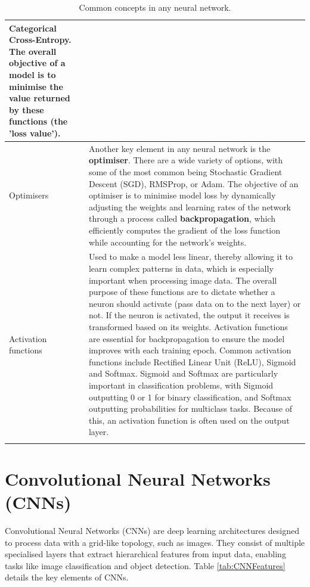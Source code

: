 \documentclass[12pt]{report}
\begin{document}
\begin{longtable}{ | p{} | p{} | }
    Categorical Cross-Entropy. The overall objective of a model is to minimise the value returned by these functions (the 'loss value').  \\
    \hline 
    Optimisers & Another key element in any neural network is the \textbf{optimiser}. There are a wide variety of options,
    with some of the most common being Stochastic Gradient Descent (SGD), RMSProp, or Adam. The objective of an optimiser 
    is to minimise model loss by dynamically adjusting the weights and learning rates of the network through a process called 
    \textbf{backpropagation}, which efficiently computes the gradient of the loss function while accounting for the 
    network's weights. \\
    \hline 
    Activation functions & Used to make a model 
    less linear, thereby allowing it to learn complex patterns in data, which is especially important when processing image data.
    The overall purpose of these functions are to dictate whether a neuron should activate (pass data on to the next layer) or not.
    If the neuron is activated, the output it receives is transformed based on its weights. Activation functions are essential 
    for backpropagation to ensure the model improves with each training epoch. Common activation functions include Rectified Linear 
    Unit (ReLU), Sigmoid and Softmax. Sigmoid and Softmax are particularly important in classification problems, with Sigmoid 
    outputting 0 or 1 for binary classification, and Softmax outputting probabilities for multiclass tasks. Because of this, an activation 
    function is often used on the output layer.   \\
    \hline 
    \caption{Common concepts in any neural network.}\label{tab:NeuralNetworkComponents}
\end{longtable}


\section{Convolutional Neural Networks (CNNs)}
Convolutional Neural Networks (CNNs) are deep learning architectures designed to process data with a grid-like topology, such as images.
They consist of multiple specialised layers that extract hierarchical features from input data, enabling tasks like image classification and 
object detection. Table \ref{tab:CNNFeatures} details the key elements of CNNs.
\end{document}
